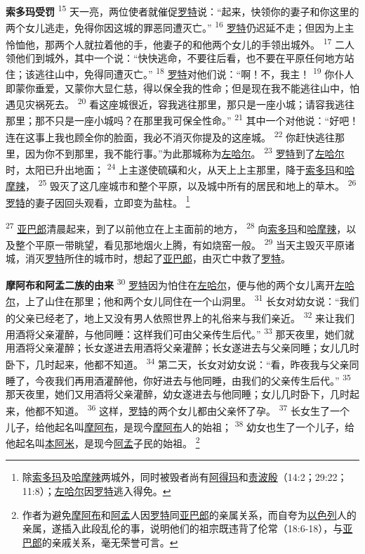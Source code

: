\textbf{索多玛受罚 }
\textsuperscript{15}
天一亮，两位使者就催促\uline{罗特}说：“起来，快领你的妻子和你这里的两个女儿逃走，免得你因这城的罪恶同遭灭亡。”
\textsuperscript{16}
\uline{罗特}仍迟延不走；但因为上主怜恤他，那两个人就拉着他的手，他妻子的和他两个女儿的手领出城外。
\textsuperscript{17}
二人领他们到城外，其中一个说：“快快逃命，不要往后看，也不要在平原任何地方站住；该逃往山中，免得同遭灭亡。”
\textsuperscript{18}
\uline{罗特}对他们说：“啊！不，我主！
\textsuperscript{19}
你仆人即蒙你垂爱，又蒙你大显仁慈，得以保全我的性命；但是现在我不能逃往山中，怕遇见灾祸死去。
\textsuperscript{20}
看这座城很近，容我逃往那里，那只是一座小城；请容我逃往那里；那不只是一座小城吗？在那里我可保全性命。”
\textsuperscript{21}
其中一个对他说：“好吧！连在这事上我也顾全你的脸面，我必不消灭你提及的这座城。
\textsuperscript{22}
你赶快逃往那里，因为你不到那里，我不能行事。”为此那城称为\uline{左哈尔}。
\textsuperscript{23}
\uline{罗特}到了\uline{左哈尔}时，太阳已升出地面；
\textsuperscript{24}
上主遂使硫磺和火，从天上上主那里，降于\uline{索多玛}和\uline{哈摩辣}，
\textsuperscript{25}
毁灭了这几座城市和整个平原，以及城中所有的居民和地上的草木。
\textsuperscript{26}
\uline{罗特}的妻子因回头观看，立即变为盐柱。
\footnote{除\uline{索多玛}及\uline{哈摩辣}两城外，同时被毁者尚有\uline{阿得玛}和\uline{责波殷}（14:2；29:22；11:8）；\uline{左哈尔}因\uline{罗特}逃入得免。}

\textsuperscript{27}
\uline{亚巴郎}清晨起来，到了以前他立在上主面前的地方，
\textsuperscript{28}
向\uline{索多玛}和\uline{哈摩辣}，以及整个平原一带眺望，看见那地烟火上腾，有如烧窑一般。
\textsuperscript{29}
当天主毁灭平原诸城，消灭\uline{罗特}所住的城市时，想起了\uline{亚巴郎}，由灭亡中救了\uline{罗特}。

\textbf{摩阿布和阿孟二族的由来 }
\textsuperscript{30}
\uline{罗特}因为怕住在\uline{左哈尔}，便与他的两个女儿离开\uline{左哈尔}，上了山住在那里；他和两个女儿同住在一个山洞里。
\textsuperscript{31}
长女对幼女说：“我们的父亲已经老了，地上又没有男人依照世界上的礼俗来与我们亲近。
\textsuperscript{32}
来让我们用酒将父亲灌醉，与他同睡：这样我们可由父亲传生后代。”
\textsuperscript{33}
那天夜里，她们就用酒将父亲灌醉；长女遂进去用酒将父亲灌醉；长女遂进去与父亲同睡；女儿几时卧下，几时起来，他都不知道。
\textsuperscript{34}
第二天，长女对幼女说：“看，昨夜我与父亲同睡了，今夜我们再用酒灌醉他，你好进去与他同睡，由我们的父亲传生后代。”
\textsuperscript{35}
那天夜里，她们又用酒将父亲灌醉，幼女遂进去与他同睡；女儿几时卧下，几时起来，他都不知道。
\textsuperscript{36}
这样，\uline{罗特}的两个女儿都由父亲怀了孕。
\textsuperscript{37}
长女生了一个儿子，给他起名叫\uline{摩阿布}，是现今\uline{摩阿布}人的始祖；
\textsuperscript{38}
幼女也生了一个儿子，给他起名叫\uline{本阿米}，是现今\uline{阿孟}子民的始祖。
\footnote{作者为避免\uline{摩阿布}和\uline{阿孟}人因\uline{罗特}同\uline{亚巴郎}的亲属关系，而自夸为\uline{以色列}人的亲属，遂插入此段乱伦的事，说明他们的祖宗既违背了伦常（18:6-18），与\uline{亚巴郎}的亲戚关系，毫无荣誉可言。}

